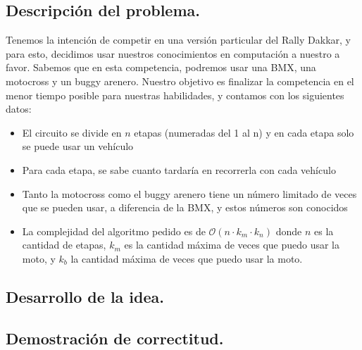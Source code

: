 \subsection{Descripción del problema.}

\vspace*{0.3cm}

Tenemos la intención de competir en una versión particular del Rally Dakkar, y para esto, decidimos usar nuestros conocimientos en computación a nuestro a favor. Sabemos que en esta competencia, podremos usar una BMX, una motocross y un buggy arenero. Nuestro objetivo es finalizar la competencia en el menor tiempo posible para nuestras habilidades, y contamos con los siguientes datos:

\begin{itemize}

	\item El circuito se divide en $n$ etapas (numeradas del 1 al n) y en cada etapa solo se puede usar un vehículo
	\item Para cada etapa, se sabe cuanto tardaría en recorrerla con cada vehículo
	\item Tanto la motocross como el buggy arenero tiene un número limitado de veces que se pueden usar, a diferencia de la BMX, y estos números son conocidos
	\item La complejidad del algoritmo pedido es de $\mathcal{O}(n \cdot k_{m} \cdot k_{n})$ donde $n$ es la cantidad de etapas, $k_{m}$ es la cantidad máxima de veces que puedo usar la moto, y $k_{b}$ la cantidad máxima de veces que puedo usar la moto.

\end{itemize}

\vspace*{0.6cm}
\subsection{Desarrollo de la idea.}

\vspace*{0.3cm}


\vspace*{0.6cm}

\subsection{Demostración de correctitud.}

\vspace*{0.3cm}



